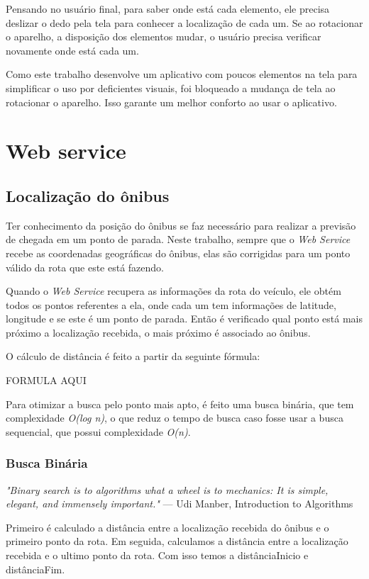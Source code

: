 \documentclass[
	12pt,				%
	oneside,			%
	a4paper,			%
	brazil				%
]{abntex2}
\begin{document}
Pensando no usuário final, para saber onde está cada elemento, ele precisa deslizar o dedo pela tela para conhecer a localização de cada um. Se ao rotacionar o aparelho, a disposição dos elementos mudar, o usuário precisa verificar novamente onde está cada um.

Como este trabalho desenvolve um aplicativo com poucos elementos na tela para simplificar o uso por deficientes visuais, foi bloqueado a mudança de tela ao rotacionar o aparelho. Isso garante um melhor conforto ao usar o aplicativo.


\section{Web service}

\subsection{Localização do ônibus}

Ter conhecimento da posição do ônibus se faz necessário para realizar a previsão de chegada em um ponto de parada. Neste trabalho, sempre que o \textit{Web Service} recebe as coordenadas geográficas do ônibus, elas são corrigidas para um ponto válido da rota que este está fazendo.

Quando o \textit{Web Service} recupera as informações da rota do veículo, ele obtém todos os pontos referentes a ela, onde cada um tem informações de latitude, longitude e se este é um ponto de parada. Então é verificado qual ponto está mais próximo a localização recebida, o mais próximo é associado ao ônibus.

O cálculo de distância é feito a partir da seguinte fórmula:

FORMULA AQUI

Para otimizar a busca pelo ponto mais apto, é feito uma busca binária, que tem complexidade \textit{O(log n)}, o que reduz o tempo de busca caso fosse usar a busca sequencial, que possui complexidade \textit{O(n)}. 

\subsubsection{Busca Binária}

\textit{"Binary search is to algorithms
what a wheel is to mechanics:
It is simple, elegant, and immensely important."}
— Udi Manber, Introduction to Algorithms


Primeiro é calculado a distância entre a localização recebida do ônibus e o primeiro ponto da rota. 
Em seguida, calculamos a distância entre a localização recebida e o ultimo ponto da rota. Com isso temos a distânciaInicio e distânciaFim. 
\end{document}
